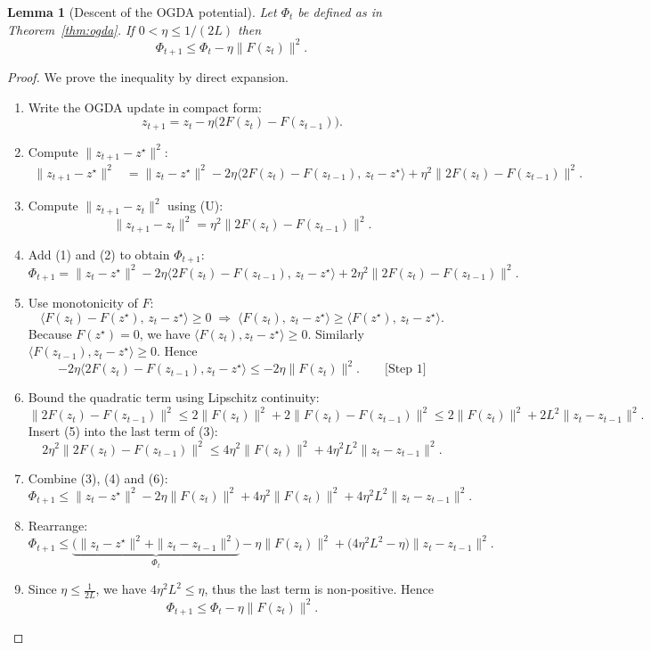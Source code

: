 \documentclass{article}
\newtheorem{lemma}{Lemma}
\begin{document}
\begin{lemma}[Descent of the OGDA potential]\label{lem:descent}
Let $\Phi_{t}$ be defined as in Theorem~\ref{thm:ogda}. If $0<\eta\le 1/(2L)$ then
\[
\Phi_{t+1}\le \Phi_{t}-\eta\|F(z_{t})\|^{2}.
\]
\end{lemma}
\begin{proof}
We prove the inequality by direct expansion.
\begin{enumerate}
\item Write the OGDA update in compact form:
\[
z_{t+1}=z_{t}-\eta\bigl(2F(z_{t})-F(z_{t-1})\bigr).\tag{U}
\]
\item Compute $\|z_{t+1}-z^{\star}\|^{2}$:
\[
\begin{aligned}
\|z_{t+1}-z^{\star}\|^{2}
&=\|z_{t}-z^{\star}\|^{2}
-2\eta\langle 2F(z_{t})-F(z_{t-1}),\,z_{t}-z^{\star}\rangle
+\eta^{2}\|2F(z_{t})-F(z_{t-1})\|^{2}. \tag{1}
\end{aligned}
\]
\item Compute $\|z_{t+1}-z_{t}\|^{2}$ using (U):
\[
\|z_{t+1}-z_{t}\|^{2}
=\eta^{2}\|2F(z_{t})-F(z_{t-1})\|^{2}. \tag{2}
\]
\item Add (1) and (2) to obtain $\Phi_{t+1}$:
\[
\Phi_{t+1}
= \|z_{t}-z^{\star}\|^{2}
-2\eta\langle 2F(z_{t})-F(z_{t-1}),\,z_{t}-z^{\star}\rangle
+2\eta^{2}\|2F(z_{t})-F(z_{t-1})\|^{2}. \tag{3}
\]
\item Use monotonicity of $F$:
\[
\langle F(z_{t})-F(z^{\star}),\,z_{t}-z^{\star}\rangle\ge0
\;\Longrightarrow\;
\langle F(z_{t}),\,z_{t}-z^{\star}\rangle\ge \langle F(z^{\star}),\,z_{t}-z^{\star}\rangle.
\]
Because $F(z^{\star})=0$, we have $\langle F(z_{t}),z_{t}-z^{\star}\rangle\ge0$.
Similarly $\langle F(z_{t-1}),z_{t}-z^{\star}\rangle\ge0$.
Hence
\[
-2\eta\langle 2F(z_{t})-F(z_{t-1}),z_{t}-z^{\star}\rangle
\le -2\eta\|F(z_{t})\|^{2}. \tag{4}\qquad\text{[Step 1]}
\]
\item Bound the quadratic term using Lipschitz continuity:
\[
\|2F(z_{t})-F(z_{t-1})\|^{2}
\le 2\|F(z_{t})\|^{2}+2\|F(z_{t})-F(z_{t-1})\|^{2}
\le 2\|F(z_{t})\|^{2}+2L^{2}\|z_{t}-z_{t-1}\|^{2}. \tag{5}
\]
Insert (5) into the last term of (3):
\[
2\eta^{2}\|2F(z_{t})-F(z_{t-1})\|^{2}
\le 4\eta^{2}\|F(z_{t})\|^{2}+4\eta^{2}L^{2}\|z_{t}-z_{t-1}\|^{2}. \tag{6}
\]
\item Combine (3), (4) and (6):
\[
\Phi_{t+1}\le \|z_{t}-z^{\star}\|^{2}
-2\eta\|F(z_{t})\|^{2}
+4\eta^{2}\|F(z_{t})\|^{2}
+4\eta^{2}L^{2}\|z_{t}-z_{t-1}\|^{2}. \tag{7}
\]
\item Rearrange:
\[
\Phi_{t+1}\le \underbrace{\bigl(\|z_{t}-z^{\star}\|^{2}+\|z_{t}-z_{t-1}\|^{2}\bigr)}_{\Phi_{t}}
-\eta\|F(z_{t})\|^{2}
+\bigl(4\eta^{2}L^{2}-\eta\bigr)\|z_{t}-z_{t-1}\|^{2}. \tag{8}
\]
\item Since $\eta\le\frac{1}{2L}$, we have $4\eta^{2}L^{2}\le\eta$, thus the last term is non‑positive. Hence
\[
\Phi_{t+1}\le\Phi_{t}-\eta\|F(z_{t})\|^{2}. \tag{9}
\]
\end{enumerate}
\end{proof}
\end{document}
